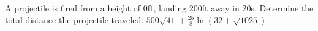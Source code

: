 {A projectile is fired from a height of 0ft, landing 200ft away in 20s.  Determine the total distance the projectile traveled.
}
{$500 \sqrt{41} + \frac{25}{8}\ln\left(32 + \sqrt{1025}  \right)$
}